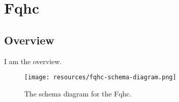 
\section{Fqhc}
\label{sec:fqhc}
\subsection{Overview}
\label{ssec:overview}

I am the overview.

\begin{figure}[h!]
  \begin{center}
    \texttt{[image: resources/fqhc-schema-diagram.png]}
  \end{center}
  \caption{The schema diagram for the Fqhc.}
  \label{fig:ov-diagram}
\end{figure}


